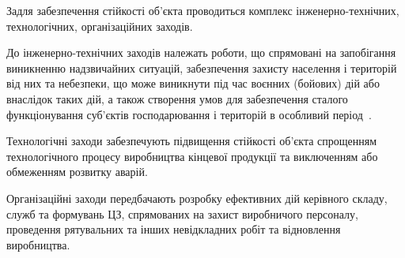 Задля забезпечення стійкості об'єкта проводиться комплекс інженерно-технічних, технологічних, організаційних заходів.

До інженерно-технічних заходів належать роботи, що спрямовані на запобігання виникненню надзвичайних ситуацій, забезпечення захисту населення і територій від них та небезпеки, що може виникнути під час воєнних (бойових) дій або внаслідок таких дій, а також створення умов для забезпечення сталого функціонування суб'єктів господарювання і територій в особливий період~\cite{Civ1}.

Технологічні заходи забезпечують підвищення стійкості об'єкта спрощенням технологічного процесу виробництва кінцевої продукції та виключенням або обмеженням розвитку аварій.

Організаційні заходи передбачають розробку ефективних дій керівного складу, служб та формувань ЦЗ, спрямованих на захист виробничого персоналу, проведення рятувальних та інших невідкладних робіт та відновлення виробництва.

